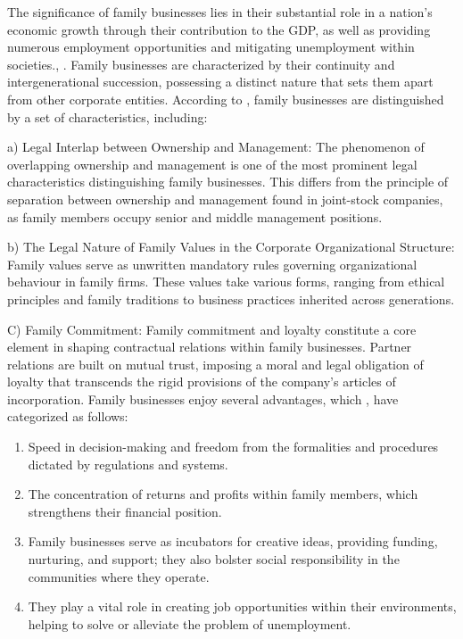 \documentclass[10pt]{NSP1}
\begin{document}
The significance of family businesses lies in their substantial role in a nation's economic growth through their contribution to the GDP, as well as providing numerous employment opportunities and mitigating unemployment within societies.\cite{ref14}, \cite{ref15}. Family businesses are characterized by their continuity and intergenerational succession, possessing a distinct nature that sets them apart from other corporate entities. According to \cite{ref16}, family businesses are distinguished by a set of characteristics, including:

a) Legal Interlap between Ownership and Management: The phenomenon of overlapping ownership and management is one of the most prominent legal characteristics distinguishing family businesses. This differs from the principle of separation between ownership and management found in joint-stock companies, as family members occupy senior and middle management positions.

b) The Legal Nature of Family Values in the Corporate Organizational Structure: Family values serve as unwritten mandatory rules governing organizational behaviour in family firms. These values take various forms, ranging from ethical principles and family traditions to business practices inherited across generations.

C) Family Commitment: Family commitment and loyalty constitute a core element in shaping contractual relations within family businesses. Partner relations are built on mutual trust, imposing a moral and legal obligation of loyalty that transcends the rigid provisions of the company's articles of incorporation. Family businesses enjoy several advantages, which \cite{ref18}, \cite{ref17} have categorized as follows:

\begin{enumerate}
  \item Speed in decision-making and freedom from the formalities and procedures dictated by regulations and systems.
  \item The concentration of returns and profits within family members, which strengthens their financial position.
  \item Family businesses serve as incubators for creative ideas, providing funding, nurturing, and support; they also bolster social responsibility in the communities where they operate.
  \item They play a vital role in creating job opportunities within their environments, helping to solve or alleviate the problem of unemployment.
\end{enumerate}
\end{document}

